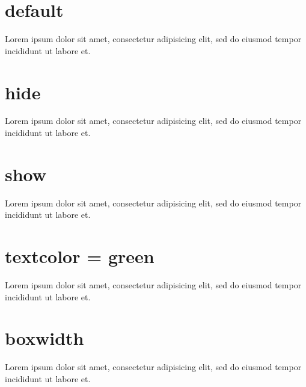 \documentclass{article}
\begin{document}
{}

\section{default}

\begin{clozebox}
Lorem ipsum dolor sit amet, consectetur adipisicing elit, sed do eiusmod
tempor incididunt ut labore et.
\end{clozebox}

\section{hide}

\clozehide

\begin{clozebox}
Lorem ipsum dolor sit amet, consectetur adipisicing elit, sed do eiusmod
tempor incididunt ut labore et.
\end{clozebox}

\section{show}

\clozeshow

\begin{clozebox}
Lorem ipsum dolor sit amet, consectetur adipisicing elit, sed do eiusmod
tempor incididunt ut labore et.
\end{clozebox}

\section{textcolor = green}


\begin{clozebox}
Lorem ipsum dolor sit amet, consectetur adipisicing elit, sed do eiusmod
tempor incididunt ut labore et.
\end{clozebox}

\section{boxwidth}

\clozereset

\begin{clozebox}[boxwidth=5cm]
Lorem ipsum dolor sit amet, consectetur adipisicing elit, sed do eiusmod
tempor incididunt ut labore et.
\end{clozebox}
\end{document}
